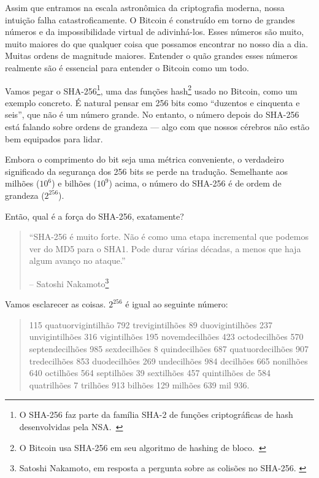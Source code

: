 Assim que entramos na escala astronômica da criptografia moderna, nossa intuição falha catastroficamente. O Bitcoin é construído em torno de grandes números e da impossibilidade virtual de adivinhá-los. Esses números são muito, muito maiores do que qualquer coisa que possamos encontrar no nosso dia a dia. Muitas ordens de magnitude maiores. Entender o quão grandes esses números realmente são é essencial para entender o Bitcoin como um todo.

Vamos pegar o SHA-256\footnote{O SHA-256 faz parte da família SHA-2 de funções criptográficas de hash desenvolvidas pela NSA.~\cite{wiki:sha2}}, uma das funções hash\footnote{O Bitcoin usa SHA-256 em seu algoritmo de hashing de bloco.~\cite{btcwiki:block-hashing}} usado no Bitcoin, como um exemplo concreto. É natural pensar em 256 bits como \enquote{duzentos e cinquenta e seis}, que não é um número grande. No entanto, o número depois do SHA-256 está falando sobre ordens de grandeza --- algo com que nossos cérebros não estão bem equipados para lidar.

Embora o comprimento do bit seja uma métrica conveniente, o verdadeiro significado da segurança dos 256 bits se perde na tradução. Semelhante aos milhões ($10^6$) e bilhões ($10^9$) acima, o número do SHA-256 é de ordem de grandeza ($2^{256}$).

Então, qual é a força do SHA-256, exatamente?

\begin{quotation}\begin{samepage}
\enquote{SHA-256 é muito forte. Não é como uma etapa incremental que podemos ver do MD5 para o SHA1. Pode durar várias décadas, a menos que haja algum avanço no ataque.}
\begin{flushright} -- Satoshi Nakamoto\footnote{Satoshi Nakamoto, em resposta a pergunta sobre as colisões no SHA-256. \cite{satoshi-sha256}}
\end{flushright}\end{samepage}\end{quotation}

Vamos esclarecer as coisas. $2^{256}$ é igual ao seguinte número:

\begin{quotation}\begin{samepage}
    115 quatuorvigintilhão 792 trevigintilhões 89 duovigintilhões 237 unvigintilhões 316 vigintilhões 195 novemdecilhões 423 octodecilhões 570 septendecilhões 985 sexdecilhões 8 quindecilhões 687 quatuordecilhões 907 tredecilhões 853 duodecilhões 269 undecilhões 984 decilhões 665 nonilhões 640 octilhões 564 septilhões 39 sextilhões 457 quintilhões de 584 quatrilhões 7 trilhões 913 bilhões 129 milhões 639 mil 936.
\end{samepage}\end{quotation}

